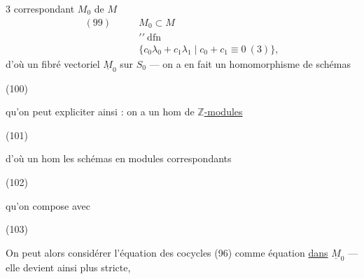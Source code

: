 
$3$ correspondant $M_0$ de $M$
\[
\begin{aligned}
(99)\qquad&M_0\subset M\\[-2pt]
&\prime\prime\ \mathrm{dfn}\\[-2pt]
&\{c_0\lambda_0+c_1\lambda_1\mid c_0+c_1\equiv0\ (3)\},
\end{aligned}
\]
d'où un fibré vectoriel $\underline M_0$ sur $S_0$ ---
on a en fait un homomorphisme de schémas

\begin{samepage}
(100)
\end{samepage}
qu'on peut expliciter ainsi : on a un hom de \uline{$\mathbb Z$-modules}

\begin{samepage}
(101)
\end{samepage}
d'où un hom  les schémas en modules correspondants

\begin{samepage}
(102)
\end{samepage}
qu'on compose avec

\begin{samepage}
(103)
\end{samepage}
On peut alors considérer l'équation des cocycles (96) comme équation \uline{dans}
$\underline M_0$ --- elle devient ainsi plus stricte,

